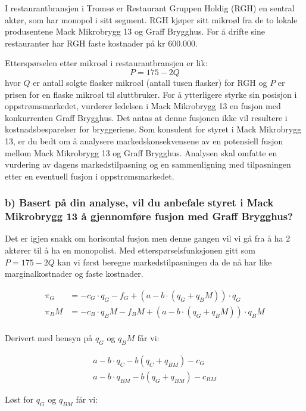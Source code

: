 \documentclass[
  12pt,
  a4paper,
  DIV=11,
  numbers=noendperiod]{scrartcl}
\begin{document}
I restaurantbransjen i Tromsø er Restaurant Gruppen Holdig (RGH) en
sentral aktør, som har monopol i sitt segment. RGH kjøper sitt mikroøl
fra de to lokale produsentene Mack Mikrobrygg 13 og Graff Brygghus. For
å drifte sine restauranter har RGH faste kostnader på kr 600.000.

Etterspørselen etter mikroøl i restaurantbransjen er lik: \[
P = 175 - 2Q
\] hvor \(Q\) er antall solgte flasker mikroøl (antall tusen flasker)
for RGH og \(P\) er prisen for en flaske mikroøl til sluttbruker. For å
ytterligere styrke sin posisjon i oppstrømsmarkedet, vurderer ledelsen i
Mack Mikrobrygg 13 en fusjon med konkurrenten Graff Brygghus. Det antas
at denne fusjonen ikke vil resultere i kostnadsbesparelser for
bryggeriene. Som konsulent for styret i Mack Mikrobrygg 13, er du bedt
om å analysere markedskonsekvensene av en potensiell fusjon mellom Mack
Mikrobrygg 13 og Graff Brygghus. Analysen skal omfatte en vurdering av
dagens markedstilpasning og en sammenligning med tilpasningen etter en
eventuell fusjon i oppstrømsmarkedet.

\subsubsection{b) Basert på din analyse, vil du anbefale styret i Mack
Mikrobrygg 13 å gjennomføre fusjon med Graff
Brygghus?}\label{b-basert-puxe5-din-analyse-vil-du-anbefale-styret-i-mack-mikrobrygg-13-uxe5-gjennomfuxf8re-fusjon-med-graff-brygghus}

Det er igjen snakk om horisontal fusjon men denne gangen vil vi gå fra å
ha 2 aktører til å ha en monopolist. Med etterspørselsfunksjonen gitt
som \(P=175-2Q\) kan vi først beregne markedstilpasningen da de nå har
like marginalkostnader og faste kostnader.

\begin{align*}
\pi_G &= -c_G\cdot q_G - f_G + (a-b\cdot(q_G+q_BM))\cdot q_G \\
\pi_BM &= -c_B\cdot q_BM - f_BM + (a-b\cdot(q_G+q_BM))\cdot q_BM \\
\end{align*}

Derivert med hensyn på \(q_G\) og \(q_BM\) får vi:

\begin{align*}
a-b\cdot q_C - b(q_C + q_{BM})- c_G \\
a-b\cdot q_{BM} - b(q_G + q_{BM})- c_{BM} 
\end{align*}

Løst for \(q_G\) og \(q_{BM}\) får vi:
\end{document}
